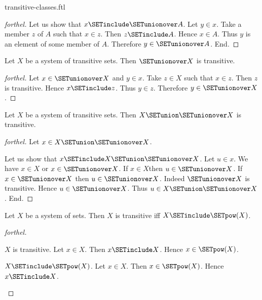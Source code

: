 \documentclass{naproche-library}
\begin{document}
\begin{smodule}[title=Transitive Classes]{transitive-classes.ftl}
\begin{proof}[forthel]
  Let us show that $x \SETinclude \SETunionover A$.
    Let $y \in x$.
    Take a member $z$ of $A$ such that $x \in z$.
    Then $z \SETinclude A$.
    Hence $x \in A$.
    Thus $y$ is an element of some member of $A$.
    Therefore $y \in \SETunionover A$.
  End.
\end{proof}

\begin{proposition}[forthel,id=SET_THEORY_01_6726468811882496]
  Let $X$ be a system of transitive sets.
  Then $\SETunionover X$ is transitive.
\end{proposition}
\begin{proof}[forthel]
  Let $x \in \SETunionover X$ and $y \in x$.
  Take $z \in X$ such that $x \in z$.
  Then $z$ is transitive.
  Hence $x \SETinclude z$.
  Thus $y \in z$.
  Therefore $y \in \SETunionover X$.
\end{proof}

\begin{proposition}[forthel,id=SET_THEORY_01_4884401668227072]
  Let $X$ be a system of transitive sets.
  Then $X \SETunion \SETunionover X$ is transitive.
\end{proposition}
\begin{proof}[forthel]
  Let $x \in X \SETunion \SETunionover X$.

  Let us show that $x \SETinclude X \SETunion \SETunionover X$.
    Let $u \in x$.
    We have $x \in X$ or $x \in \SETunionover X$.
    If $x \in X$then $u \in \SETunionover X$.
    If $x \in \SETunionover X$ then $u \in \SETunionover X$.
    Indeed $\SETunionover X$ is transitive.
    Hence $u \in \SETunionover X$.
    Thus $u \in X \SETunion \SETunionover X$.
  End.
\end{proof}

\begin{proposition}[forthel,id=SET_THEORY_01_1399002962591744]
  Let $X$ be a system of sets.
  Then $X$ is transitive iff $X \SETinclude \SETpow(X)$.
\end{proposition}
\begin{proof}[forthel]
  \begin{case}{$X$ is transitive.}
    Let $x \in X$.
    Then $x \SETinclude X$.
    Hence $x \in \SETpow(X)$.
  \end{case}

  \begin{case}{$X \SETinclude \SETpow(X)$.}
    Let $x \in X$.
    Then $x \in \SETpow(X)$.
    Hence $x \SETinclude X$.
  \end{case}
\end{proof}


\end{smodule}
\end{document}
